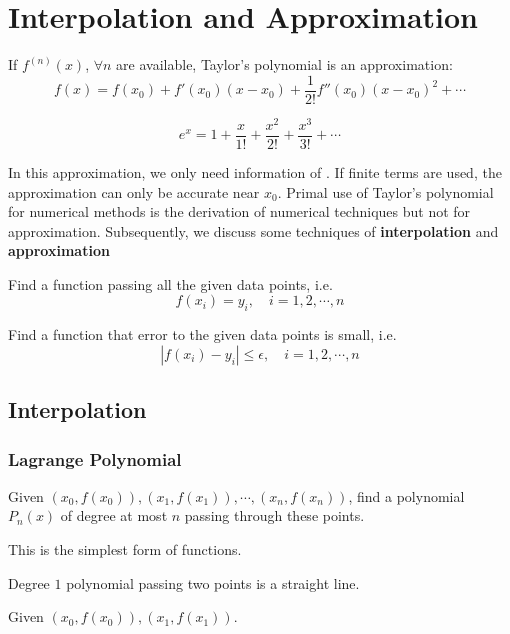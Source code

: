 \chapter{Interpolation and Approximation}

If $f^{(n)}(x)$, $\forall n$ are available, Taylor's polynomial is an approximation: \[
    f(x) = f(x_0) + f'(x_0)(x-x_0) + \frac{1}{2!} f''(x_0)(x-x_0)^2 + \cdots 
\]
\begin{eg}
    \[
        e^x  = 1 + \frac{x}{1!} + \frac{x^2}{2!} + \frac{x^3}{3!} + \cdots
    \]
\end{eg}

In this approximation, we only need information of . If finite terms are used, the approximation can only be accurate near $x_0$. Primal use of Taylor's polynomial for numerical methods is the derivation of numerical techniques but not for approximation. Subsequently, we discuss some techniques of \textbf{interpolation} and \textbf{approximation}

\begin{definition}[Interpolation]
    Find a function passing all the given data points, i.e. \[
        f(x_i) = y_i, \quad i = 1,2,\cdots,n
    \]
\end{definition}

\begin{definition}[Approximation]
    Find a function that error to the given data points is small, i.e. \[
        |f(x_i) - y_i| \leq \epsilon, \quad i = 1,2,\cdots,n
    \]
\end{definition}

\section{Interpolation}

\subsection{Lagrange Polynomial}

Given $(x_0, f(x_0)), (x_1, f(x_1)), \cdots, (x_n, f(x_n))$, find a polynomial $P_n(x)$ of degree at most $n$ passing through these points.

\begin{note}
    This is the simplest form of functions.
\end{note}

Degree $1$ polynomial passing two points is a straight line.

\begin{eg}
    Given $(x_0, f(x_0)), (x_1, f(x_1))$.
\end{eg}

